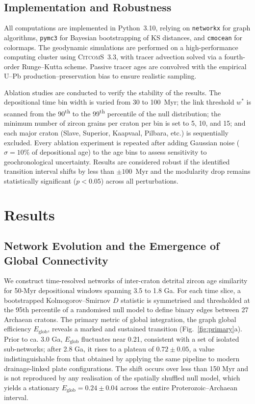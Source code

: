 \documentclass{article}
\begin{document}
\subsection{Implementation and Robustness}
All computations are implemented in Python~3.10, relying on \texttt{networkx} for graph algorithms, \texttt{pymc3} for Bayesian bootstrapping of KS distances, and \texttt{cmocean} for colormaps. The geodynamic simulations are performed on a high-performance computing cluster using \textsc{CitcomS}~3.3, with tracer advection solved via a fourth-order Runge–Kutta scheme. Passive tracer ages are convolved with the empirical U–Pb production–preservation bias to ensure realistic sampling.

Ablation studies are conducted to verify the stability of the results. The depositional time bin width is varied from 30 to 100~Myr; the link threshold $w^*$ is scanned from the 90\textsuperscript{th} to the 99\textsuperscript{th} percentile of the null distribution; the minimum number of zircon grains per craton per bin is set to 5, 10, and 15; and each major craton (Slave, Superior, Kaapvaal, Pilbara, etc.) is sequentially excluded. Every ablation experiment is repeated after adding Gaussian noise ($\sigma = 10\%$ of depositional age) to the age bins to assess sensitivity to geochronological uncertainty. Results are considered robust if the identified transition interval shifts by less than $\pm 100$~Myr and the modularity drop remains statistically significant ($p<0.05$) across all perturbations.

\section{Results}

\subsection{Network Evolution and the Emergence of Global Connectivity}

We construct time-resolved networks of inter-craton detrital zircon age similarity for 50-Myr depositional windows spanning 3.5 to 1.8 Ga. For each time slice, a bootstrapped Kolmogorov–Smirnov \( D \) statistic is symmetrised and thresholded at the 95th percentile of a randomised null model to define binary edges between 27 Archaean cratons. The primary metric of global integration, the graph global efficiency \( E_{\text{glob}} \), reveals a marked and sustained transition (Fig.~\ref{fig:primary}a). Prior to ca. 3.0 Ga, \( E_{\text{glob}} \) fluctuates near 0.21, consistent with a set of isolated sub-networks; after 2.8 Ga, it rises to a plateau of \( 0.72 \pm 0.05 \), a value indistinguishable from that obtained by applying the same pipeline to modern drainage-linked plate configurations. The shift occurs over less than 150 Myr and is not reproduced by any realisation of the spatially shuffled null model, which yields a stationary \( E_{\text{glob}} = 0.24 \pm 0.04 \) across the entire Proterozoic–Archaean interval.
\end{document}
